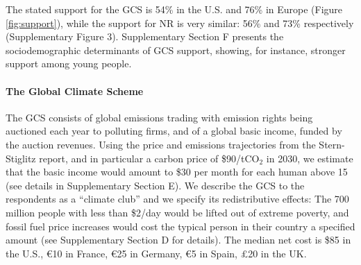 \documentclass{nature}
\begin{document}
The stated support for the GCS is 54\% in the U.S. and 76\% in Europe (Figure \ref{fig:support}), %
while the support for NR is very similar: 56\% and 73\% respectively (Supplementary Figure 3). Supplementary Section F presents the sociodemographic determinants of GCS support, showing, for instance, stronger support among young people.

\begin{tcolorbox}\label{box:GCS}
  \paragraph{The Global Climate Scheme} The GCS consists of global emissions trading with emission rights being auctioned each year to polluting firms, and of a global basic income, funded by the auction revenues. Using the price and emissions trajectories from the Stern-Stiglitz report,\cite{stern_report_2017} and in particular a carbon price of \$90/tCO$_\text{2}$ in 2030, we estimate that the basic income would amount to \$30 per month for each human above 15 (see details in Supplementary Section E). %
  We describe the GCS to the respondents as a ``climate club'' and we specify its redistributive effects: The 700 million people with less than \$2/day would be lifted out of extreme poverty, and fossil fuel price increases would cost the typical person in their country a specified amount (see Supplementary Section D for details). The median net cost is \$85 in the U.S., \euro{}10 in France, \euro{}25 in Germany, \euro{}5 in Spain, £20 in the UK.
\end{tcolorbox}
\end{document}
